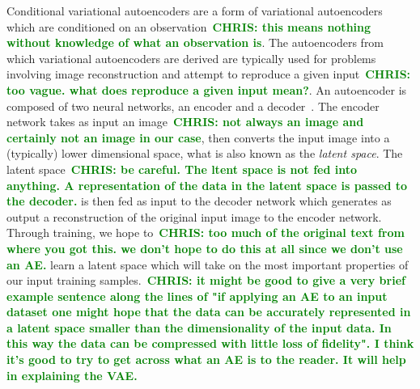 \documentclass[%
showpacs,
 amsmath,amssymb,
 aps,
 twocolumn,
 prl,
 reprint,
floatfix,
]{revtex4-1}
\newcommand{\chris}[1]{\textbf{\textcolor{green}{CHRIS: #1}}}
\begin{document}
%
%
Conditional variational autoencoders are a form of variational autoencoders
which are conditioned on an observation~\chris{this means nothing without
knowledge of what an observation is}. The autoencoders from which variational
autoencoders are derived are typically used for problems involving image
reconstruction and attempt to reproduce a given input~\chris{too vague.  what
does reproduce a given input mean?}. An autoencoder is composed of two neural
networks, an encoder and a decoder~\cite{LIOU20083150}.  The encoder network
takes as input an image~\chris{not always an image and certainly not an image
in our case}, then converts the input image into a (typically) lower
dimensional space, what is also known as the {\it{latent space}}. The latent
space~\chris{be careful. The ltent space is not fed into anything. A
representation of the data in the latent space is passed to the decoder.} is
then fed as input to the decoder network which generates as output a
reconstruction of the original input image to the encoder network. Through
training, we hope to~\chris{too much of the original text from where you got
this. we don't hope to do this at all since we don't use an AE.} learn a latent
space which will take on the most important properties of our input training
samples.~\chris{it might be good to give a very brief example sentence along
the lines of "if applying an AE to an input dataset one might hope that the
data can be accurately represented in a latent space smaller than the
dimensionality of the input data. In this way the data can be compressed with
little loss of fidelity". I think it's good to try to get across what an AE is
to the reader. It will help in explaining the VAE.}  
\end{document}
